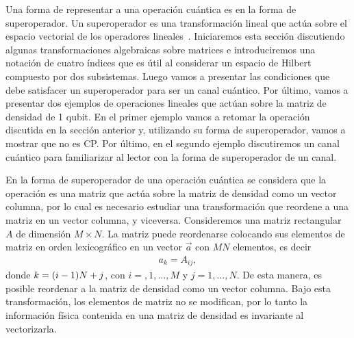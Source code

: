 Una forma de representar a una operación cuántica es en la forma de 
superoperador. Un superoperador es una transformación lineal
que actúa sobre el espacio vectorial de los operadores
lineales~\cite{preskill1998lecture}. 
Iniciaremos esta sección discutiendo algunas
transformaciones algebraicas sobre matrices e introduciremos 
una notación de cuatro índices que es útil al considerar un espacio de Hilbert 
compuesto por dos subsistemas. Luego vamos a presentar 
las condiciones que debe satisfacer un superoperador para ser un 
canal cuántico. Por último, vamos a presentar dos ejemplos de operaciones
lineales que actúan sobre la matriz de densidad de 1 qubit. En el primer 
ejemplo vamos a retomar la operación discutida en la sección anterior y, 
utilizando su forma de superoperador, vamos a mostrar que no es CP. 
Por último, en el segundo ejemplo discutiremos un canal cuántico
para familiarizar al lector con la forma de superoperador de un canal.

En la forma de superoperador de una operación cuántica se 
considera que la operación es una matriz que actúa sobre la matriz de densidad 
como un vector columna, por lo cual es necesario estudiar una 
transformación que reordene a una matriz en un vector columna, y viceversa.
Consideremos una matriz rectangular $A$ de dimensión $M\times N$.
La matriz puede reordenarse colocando sus elementos de matriz en 
orden lexicográfico en un vector $\vec{a}$ con $MN$ elementos, es decir
\begin{align}
a_k=A_{ij}, 
\label{eq:matrix-to-vector}
\end{align}
donde $k=\qty(i-1)N+j$, con $i=,1,\ldots,M$ y $j=1,\ldots,N$. De
esta manera, es posible reordenar a la matriz de densidad como un 
vector columna. Bajo esta transformación, los elementos de matriz no se 
modifican, por lo tanto la información física contenida en una matriz 
de densidad es invariante al vectorizarla.

